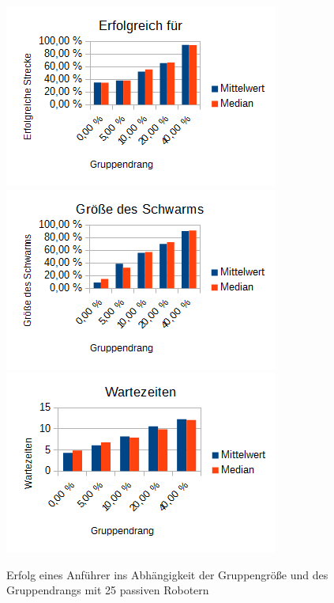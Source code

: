 \begin{figure}[h]
	\includegraphics[width=\sectionLeaderPictureWidth , keepaspectratio]{graphics/Statistics/Leader/FlockSize/25_1.png}
	\includegraphics[width=\sectionLeaderPictureWidth , keepaspectratio]{graphics/Statistics/Leader/FlockSize/25_2.png}
	\includegraphics[width=\sectionLeaderPictureWidth , keepaspectratio]{graphics/Statistics/Leader/FlockSize/25_3.png}
	\caption{Erfolg eines Anführer ins Abhängigkeit der Gruppengröße und des Gruppendrangs mit 25 passiven Robotern}
	\label{pic:LeaderSize25}
\end{figure}